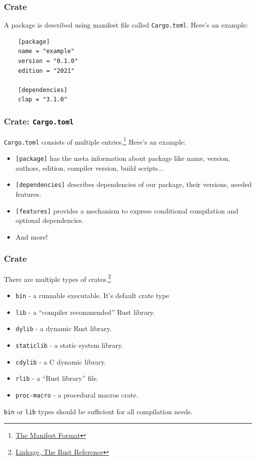 \documentclass[aspectratio=1610,t]{beamer}
\begin{document}
\begin{frame}[fragile]
\frametitle{Crate}
A package is described using manifest file called \texttt{Cargo.toml}. Here's an example:

\begin{verbatim}
    [package]
    name = "example"
    version = "0.1.0"
    edition = "2021"

    [dependencies]
    clap = "3.1.0"
\end{verbatim}
\end{frame}


\begin{frame}[fragile]
\frametitle{Crate: \texttt{Cargo.toml}}
\texttt{Cargo.toml} consists of multiple entries.\footnote{\href{https://doc.rust-lang.org/cargo/reference/manifest.html#the-rust-version-field}{The Manifest Format}} Here's an example:

\begin{itemize}
    \item \texttt{[package]} has the meta information about package like name, version, authors, edition, compiler version, build scripts...
    \item \texttt{[dependencies]} describes dependencies of our package, their versions, needed features.
    \item \texttt{[features]} provides a mechanism to express conditional compilation and optional dependencies.
    \item And more!
\end{itemize}
\end{frame}


\begin{frame}[fragile]
\frametitle{Crate}
There are multiple types of crates.\footnote{\href{https://doc.rust-lang.org/reference/linkage.html}{Linkage, The Rust Reference}}

\begin{itemize}
    \item \texttt{bin} - a runnable executable. It's default crate type
    \item \texttt{lib} - a ``compiler recommended'' Rust library.
    \item \texttt{dylib} - a dynamic Rust library.
    \item \texttt{staticlib} - a static system library.
    \item \texttt{cdylib} - a C dynamic library.
    \item \texttt{rlib} - a ``Rust library'' file.
    \item \texttt{proc-macro} - a procedural macros crate.
\end{itemize}

\texttt{bin} or \texttt{lib} types should be sufficient for all compilation needs.
\end{frame}
\end{document}

